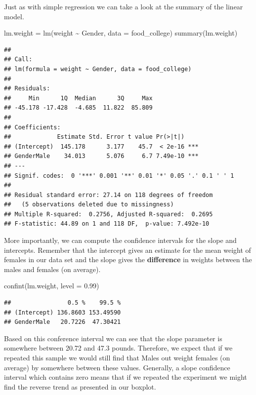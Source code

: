 \documentclass[
]{book}
\newenvironment{Shaded}{\begin{snugshade}}{\end{snugshade}}
\newcommand{\AttributeTok}[1]{\textcolor[rgb]{0.77,0.63,0.00}{#1}}
\newcommand{\FloatTok}[1]{\textcolor[rgb]{0.00,0.00,0.81}{#1}}
\newcommand{\FunctionTok}[1]{\textcolor[rgb]{0.00,0.00,0.00}{#1}}
\newcommand{\NormalTok}[1]{#1}
\newcommand{\OtherTok}[1]{\textcolor[rgb]{0.56,0.35,0.01}{#1}}
\newcommand{\SpecialCharTok}[1]{\textcolor[rgb]{0.00,0.00,0.00}{#1}}
\theoremstyle{definition}
\theoremstyle{definition}
\theoremstyle{definition}
\theoremstyle{definition}
\theoremstyle{remark}
\begin{document}
Just as with simple regression we can take a look at the summary of the linear model.

\begin{Shaded}
\begin{Highlighting}[]
\NormalTok{lm.weight }\OtherTok{=} \FunctionTok{lm}\NormalTok{(weight }\SpecialCharTok{\textasciitilde{}}\NormalTok{ Gender, }\AttributeTok{data =}\NormalTok{ food\_college)}
\FunctionTok{summary}\NormalTok{(lm.weight)}
\end{Highlighting}
\end{Shaded}

\begin{verbatim}
## 
## Call:
## lm(formula = weight ~ Gender, data = food_college)
## 
## Residuals:
##     Min      1Q  Median      3Q     Max 
## -45.178 -17.428  -4.685  11.822  85.809 
## 
## Coefficients:
##             Estimate Std. Error t value Pr(>|t|)    
## (Intercept)  145.178      3.177    45.7  < 2e-16 ***
## GenderMale    34.013      5.076     6.7 7.49e-10 ***
## ---
## Signif. codes:  0 '***' 0.001 '**' 0.01 '*' 0.05 '.' 0.1 ' ' 1
## 
## Residual standard error: 27.14 on 118 degrees of freedom
##   (5 observations deleted due to missingness)
## Multiple R-squared:  0.2756, Adjusted R-squared:  0.2695 
## F-statistic: 44.89 on 1 and 118 DF,  p-value: 7.492e-10
\end{verbatim}

More importantly, we can compute the confidence intervals for the slope and intercepts. Remember that the intercept gives an estimate for the mean weight of females in our data set and the slope gives the \textbf{difference} in weights between the males and females (on average).

\begin{Shaded}
\begin{Highlighting}[]
\FunctionTok{confint}\NormalTok{(lm.weight, }\AttributeTok{level =} \FloatTok{0.99}\NormalTok{)}
\end{Highlighting}
\end{Shaded}

\begin{verbatim}
##                0.5 %    99.5 %
## (Intercept) 136.8603 153.49590
## GenderMale   20.7226  47.30421
\end{verbatim}

Based on this conference interval we can see that the slope parameter is somewhere between 20.72 and 47.3 pounds. Therefore, we expect that if we repeated this sample we would still find that Males out weight females (on average) by somewhere between these values. Generally, a slope confidence interval which contains zero means that if we repeated the experiment we might find the reverse trend as presented in our boxplot.
\end{document}
